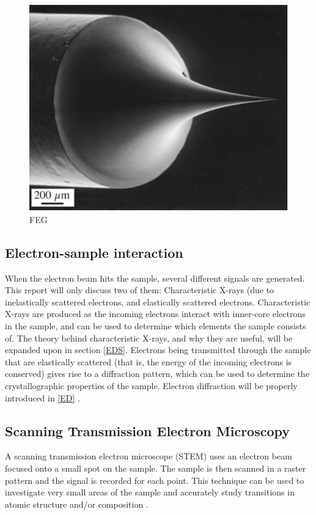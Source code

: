 \begin{figure}
	\centering
	\includegraphics[width=0.7\linewidth]{fig/FEG}
	\caption{FEG}
	\label{fig:FEG}
\end{figure}



	\subsection{Electron-sample interaction}
When the electron beam hits the sample, several different signals are generated. This report will only discuss two of them: Characteristic X-rays (due to inelastically scattered electrons, and elastically scattered electrons. Characteristic X-rays are produced as the incoming electrons interact with inner-core electrons in the sample, and can be used to determine which elements the sample consists of. The theory behind characteristic X-rays, and why they are useful, will be expanded upon in section \ref{EDS}. Electrons being transmitted through the sample that are elastically scattered (that is, the energy of the incoming electrons is conserved) gives rise to a diffraction pattern, which can be used to determine the crystallographic properties of the sample. Electron diffraction will be properly introduced in \cref{ED} \cite{williams-carter}.


	\subsection{Scanning Transmission Electron Microscopy}
A scanning transmission electron microscope (STEM) uses an electron beam focused onto a small spot on the sample. The sample is then scanned in a raster pattern and the signal is recorded for each point. This technique can be used to investigate very small areas of the sample and accurately study transitions in atomic structure and/or composition \cite{williams-carter}. 

